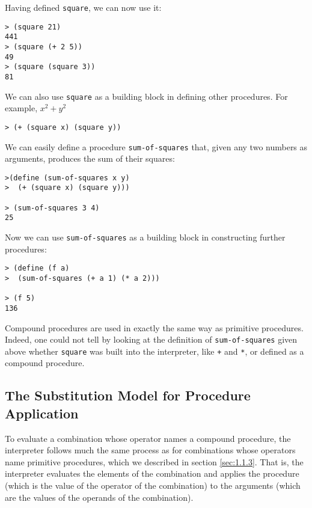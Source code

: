 Having defined \texttt{square}, we can now use it:

\begin{verbatim}
> (square 21)
441
> (square (+ 2 5))
49
> (square (square 3))
81
\end{verbatim}

We can also use \texttt{square} as a building block in defining other
procedures.  For example, $x^2 + y^2$

\begin{verbatim}
> (+ (square x) (square y))
\end{verbatim}

We can easily define a procedure \texttt{sum-of-squares} that, given
any two numbers as arguments, produces the sum of their squares:

\begin{verbatim}
>(define (sum-of-squares x y)
>  (+ (square x) (square y)))

> (sum-of-squares 3 4)
25
\end{verbatim}

Now we can use \texttt{sum-of-squares} as a building block in constructing
further procedures:

\begin{verbatim}
> (define (f a)
>  (sum-of-squares (+ a 1) (* a 2)))

> (f 5)
136
\end{verbatim}

Compound procedures are used in exactly the same way as primitive
procedures.  Indeed, one could not tell by looking at the definition
of \texttt{sum-of-squares} given above whether \texttt{square} was
built into the interpreter, like \texttt{+} and \texttt{*}, or defined
as a compound procedure.

\subsection{The Substitution Model for Procedure Application}
\label{sec:1.1.5}

To evaluate a combination whose operator names a compound procedure, the
interpreter follows much the same process as for combinations whose
operators name primitive procedures, which we described in
section \ref{sec:1.1.3}.  That is, the interpreter
evaluates the elements of the combination and applies the procedure
(which is the value of the operator of the combination) to the
arguments (which are the values of the operands of the combination).

